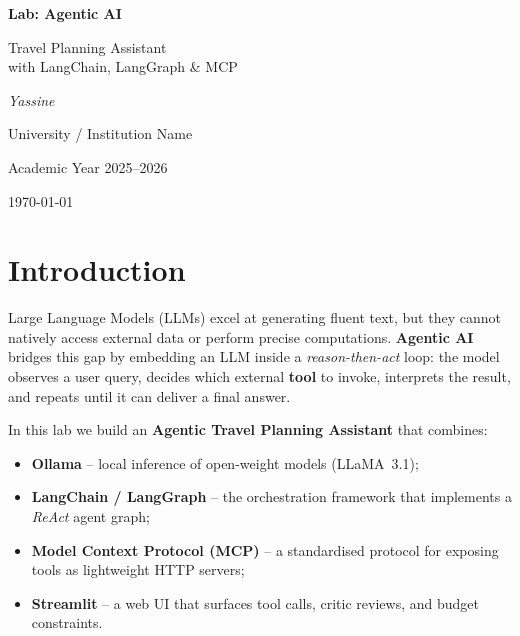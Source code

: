 \documentclass[12pt,a4paper]{article}
\begin{document}
\begin{titlepage}
\centering
\vspace*{3cm}
{\Huge\bfseries Lab: Agentic AI\\[0.4em]}
{\LARGE Travel Planning Assistant\\with LangChain, LangGraph \& MCP\par}
\vspace{1.5cm}
{\Large\itshape Yassine\par}
\vspace{1cm}
{\large University / Institution Name\par}
\vspace{0.5cm}
{\large Academic Year 2025--2026\par}
\vfill
{\large \today\par}
\end{titlepage}

\begin{center}
\end{center}
\vspace{1em}

\tableofcontents
\newpage

\section{Introduction}

Large Language Models (LLMs) excel at generating fluent text, but they cannot
natively access external data or perform precise computations.
\textbf{Agentic AI} bridges this gap by embedding an LLM inside a
\emph{reason-then-act} loop: the model observes a user query, decides which
external \textbf{tool} to invoke, interprets the result, and repeats until it
can deliver a final answer.

In this lab we build an \textbf{Agentic Travel Planning Assistant} that
combines:
\begin{itemize}[nosep]
  \item \textbf{Ollama} – local inference of open-weight models (LLaMA~3.1);
  \item \textbf{LangChain / LangGraph} – the orchestration framework that
        implements a \emph{ReAct} agent graph;
  \item \textbf{Model Context Protocol (MCP)} – a standardised protocol for
        exposing tools as lightweight HTTP servers;
  \item \textbf{Streamlit} – a web UI that surfaces tool calls, critic
        reviews, and budget constraints.
\end{itemize}
\end{document}
